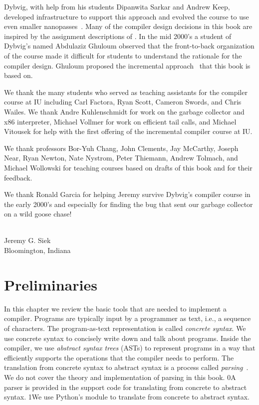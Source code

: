 \documentclass[7x10,nocrop]{TimesAPriori_MIT}%
\def\racketEd{0}
\def\pythonEd{1}
\def\edition{0}
\newcommand{\racket}[1]{{\if\edition\racketEd{#1}\fi}}
\newcommand{\python}[1]{{\if\edition\pythonEd #1\fi}}
\begin{document}
Dybvig, with help from his students Dipanwita Sarkar and Andrew Keep,
developed infrastructure to support this approach and evolved the
course to use even smaller
nanopasses~\citep{Sarkar:2004fk,Keep:2012aa}.  Many of the compiler
design decisions in this book are inspired by the assignment
descriptions of \citet{Dybvig:2010aa}. In the mid 2000's a student of
Dybvig's named Abdulaziz Ghuloum observed that the front-to-back
organization of the course made it difficult for students to
understand the rationale for the compiler design. Ghuloum proposed the
incremental approach~\citep{Ghuloum:2006bh} that this book is based
on.

We thank the many students who served as teaching assistants for the
compiler course at IU including Carl Factora, Ryan Scott, Cameron
Swords, and Chris Wailes. We thank Andre Kuhlenschmidt for work on the
garbage collector and x86 interpreter, Michael Vollmer for work on
efficient tail calls, and Michael Vitousek for help with the first
offering of the incremental compiler course at IU.

We thank professors Bor-Yuh Chang, John Clements, Jay McCarthy, Joseph
Near, Ryan Newton, Nate Nystrom, Peter Thiemann, Andrew Tolmach, and
Michael Wollowski for teaching courses based on drafts of this book
and for their feedback.

We thank Ronald Garcia for helping Jeremy survive Dybvig's compiler
course in the early 2000's and especially for finding the bug that
sent our garbage collector on a wild goose chase!

\mbox{}\\
\noindent Jeremy G. Siek \\
Bloomington, Indiana

\mainmatter

\chapter{Preliminaries}
\label{ch:trees-recur}

In this chapter we review the basic tools that are needed to implement
a compiler. Programs are typically input by a programmer as text,
i.e., a sequence of characters. The program-as-text representation is
called \emph{concrete syntax}. We use concrete syntax to concisely
write down and talk about programs. Inside the compiler, we use
\emph{abstract syntax trees} (ASTs) to represent programs in a way
that efficiently supports the operations that the compiler needs to
perform. The translation
from concrete syntax to abstract syntax is a process called
\emph{parsing}~\citep{Aho:2006wb}. We do not cover the theory and
implementation of parsing in this book.
%
\racket{A parser is provided in the support code for translating from
  concrete to abstract syntax.}
%
\python{We use Python's  module to translate from concrete
  to abstract syntax.}
\end{document}
